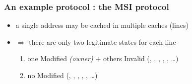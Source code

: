 \documentclass[12pt,dvipdfmx]{beamer}
\newcommand{\ao}[1]{{\color{blue}#1}}
\begin{document}
\begin{frame}
\frametitle{An example protocol : the MSI protocol}
\begin{itemize}

\item<2-> a single address may be cached in multiple 
  caches (lines)

\item<3-> $\Rightarrow$ there are only two legitimate states for each line
  \begin{enumerate}
  \item<3-> one Modified \ao{\em (owner)} 
    $+$ others Invalid (\Ibox , \Mbox , \Ibox , \Ibox , \Ibox , \ldots)
  \item<4-> no Modified (\Shbox , \Ibox , \Shbox , \Shbox , \Ibox , \ldots)
  \end{enumerate}
\end{itemize}


\end{frame}
\end{document}
